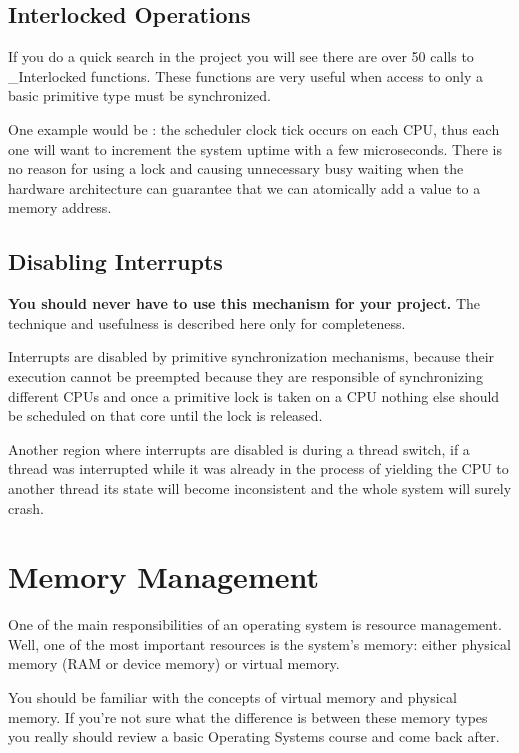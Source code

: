 \begin{appendices}
\subsection{Interlocked Operations}

If you do a quick search in the project you will see there are over 50 calls to \_Interlocked
functions. These functions are very useful when access to only a basic primitive type must be
synchronized.

One example would be : the scheduler clock tick occurs on each CPU,
thus each one will want to increment the system uptime with a few microseconds. There is no reason
for using a lock and causing unnecessary busy waiting when the hardware architecture can guarantee
that we can atomically add a value to a memory address.

\subsection{Disabling Interrupts}
\label{sect:DisablingInt}

\textbf{You should never have to use this mechanism for your project.} The technique and usefulness
is described here only for completeness.

Interrupts are disabled by primitive synchronization mechanisms, because their execution cannot be
preempted because they are responsible of synchronizing different CPUs and once a primitive lock is
taken on a CPU nothing else should be scheduled on that core until the lock is released.

Another region where interrupts are disabled is during a thread switch, if a thread was interrupted
while it was already in the process of yielding the CPU to another thread its state will become
inconsistent and the whole system will surely crash.

\section{Memory Management}
\label{sect:MemManagement}

One of the main responsibilities of an operating system is resource management. Well, one of the
most important resources is the system's memory: either physical memory (RAM or device memory) or
virtual memory.

You should be familiar with the concepts of virtual memory and physical memory. If you're not sure
what the difference is between these memory types you really should review a basic Operating Systems
course and come back after.


\end{appendices}
